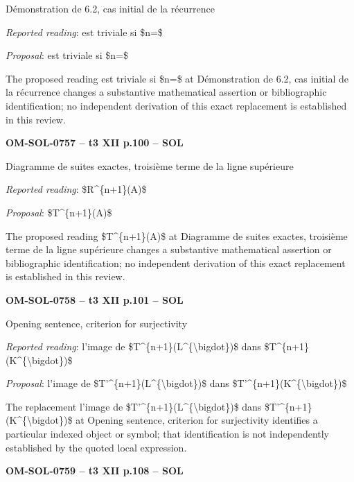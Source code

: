 Démonstration de 6.2, cas initial de la récurrence\par
\emph{Reported reading}: est triviale si \$n=\$\par
\emph{Proposal}: est triviale si \$n=\$\par
The proposed reading est triviale si \$n=\$ at Démonstration de 6.2, cas initial de la récurrence changes a substantive mathematical assertion or bibliographic identification; no independent derivation of this exact replacement is established in this review.\par
\par\noindent\textbf{OM-SOL-0757 -- t3 XII p.100 -- SOL}\par
Diagramme de suites exactes, troisième terme de la ligne supérieure\par
\emph{Reported reading}: \$R\textasciicircum{}\{n+1\}(A)\$\par
\emph{Proposal}: \$T\textasciicircum{}\{n+1\}(A)\$\par
The proposed reading \$T\textasciicircum{}\{n+1\}(A)\$ at Diagramme de suites exactes, troisième terme de la ligne supérieure changes a substantive mathematical assertion or bibliographic identification; no independent derivation of this exact replacement is established in this review.\par
\par\noindent\textbf{OM-SOL-0758 -- t3 XII p.101 -- SOL}\par
Opening sentence, criterion for surjectivity\par
\emph{Reported reading}: l'image de \$T\textasciicircum{}\{n+1\}(L\textasciicircum{}\{\textbackslash{}bigdot\})\$ dans \$T\textasciicircum{}\{n+1\}(K\textasciicircum{}\{\textbackslash{}bigdot\})\$\par
\emph{Proposal}: l'image de \$T'\textasciicircum{}\{n+1\}(L\textasciicircum{}\{\textbackslash{}bigdot\})\$ dans \$T'\textasciicircum{}\{n+1\}(K\textasciicircum{}\{\textbackslash{}bigdot\})\$\par
The replacement l'image de \$T'\textasciicircum{}\{n+1\}(L\textasciicircum{}\{\textbackslash{}bigdot\})\$ dans \$T'\textasciicircum{}\{n+1\}(K\textasciicircum{}\{\textbackslash{}bigdot\})\$ at Opening sentence, criterion for surjectivity identifies a particular indexed object or symbol; that identification is not independently established by the quoted local expression.\par
\par\noindent\textbf{OM-SOL-0759 -- t3 XII p.108 -- SOL}\par
